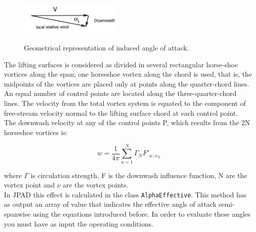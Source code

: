 \begin{figure}[H]
\centering
{\includegraphics[height=1.6cm]{Immagini/atg}} 
\caption{Geometrical representation of induced angle of attack.}
\end{figure}

The lifting surfaces is considered as divided in several rectangular horse-shoe vortices along the span; one horseshoe vortex along the chord is used, that is, the midpoints of the vortices are placed only at points along the quarter-chord lines. An equal number of control points are located along the three-quarter-chord lines. The velocity from the total vortex system is equated to the component of free-stream velocity normal to the lifting surface chord at each control point.\\
The downwash velocity at any of the control points P, which results from the 2N horseshoe vortices is:

\begin{equation}
w = \frac{1}{4\pi} \sum_{n=1}^N \Gamma_N F'_{w,\nu_N}
\end{equation}

where $\Gamma$ is circulation strength, F is the downwash influence function, N are the vortex point and $\nu$ are the vortex points.\\
In JPAD this effect is calculated in the class \texttt{AlphaEffective}.
This method has as output an array of value that indicates the effective angls of attack semi-spanwise using the equations introduced before. In order to evaluate these angles you must have as input the operating conditions. 


